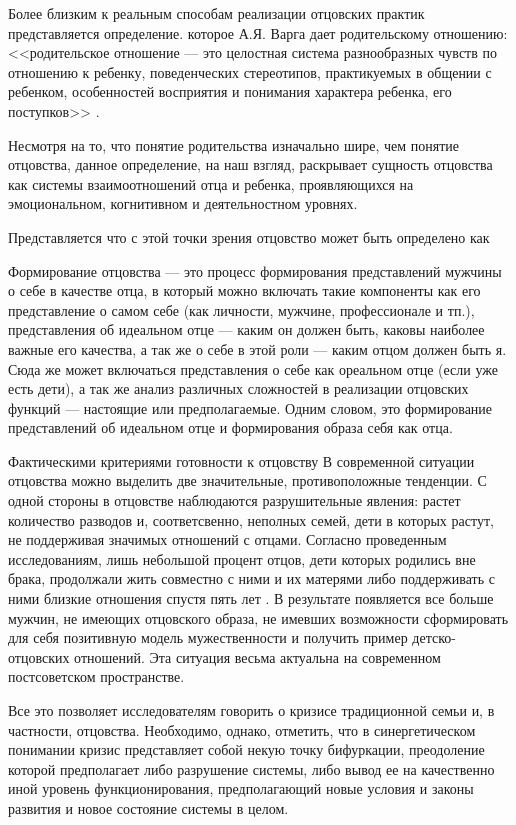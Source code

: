 \documentclass{../../common/thesisbyxetex}
\begin{document}
Более  близким к реальным способам реализации отцовских практик представляется определение. которое
А.Я. Варга дает родительскому отношению: <<родительское отношение --- это целостная система
разнообразных чувств по отношению к ребенку, поведенческих стереотипов, практикуемых в общении с
ребенком, особенностей восприятия и понимания характера ребенка, его поступков>> \cite[7]{varga}.

Несмотря на то, что понятие родительства изначально шире, чем понятие отцовства, данное
определение, на наш взгляд, раскрывает сущность отцовства как системы взаимоотношений отца и
ребенка, проявляющихся на эмоциональном, когнитивном и деятельностном уровнях.

Представляется что с этой точки
зрения отцовство может быть определено как


Формирование отцовства --- это процесс формирования представлений мужчины о себе в качестве отца, в
который можно включать такие компоненты как его представление о самом себе (как личности, мужчине,
профессионале и тп.), представления об идеальном отце --- каким он должен быть, каковы наиболее
важные его качества, а так же о себе в этой роли --- каким отцом должен быть я. Сюда же может
включаться представления о себе как ореальном отце (если уже есть дети), а так же анализ различных
сложностей в реализации отцовских функций --- настоящие или предполагаемые.
Одним словом, это формирование представлений об идеальном отце и формирования образа себя как отца.

Фактическими критериями готовности  к отцовству
В современной ситуации отцовства можно выделить две значительные, противоположные
тенденции. С одной стороны  в отцовстве наблюдаются разрушительные явления: растет количество
разводов и, соответсвенно, неполных семей, дети в которых растут, не поддерживая значимых отношений
с отцами. Согласно проведенным исследованиям, лишь небольшой процент отцов, дети которых
родились вне брака, продолжали жить совместно с ними и их матерями либо поддерживать с ними близкие
отношения спустя пять лет \cite{long}. В результате появляется все больше мужчин, не имеющих
отцовского образа, не имевших возможности сформировать для себя позитивную модель мужественности и
получить пример детско-отцовских отношений. Эта ситуация весьма актуальна на современном
постсоветском пространстве.



Все это позволяет исследователям говорить о кризисе традиционной семьи и, в частности, отцовства.
Необходимо, однако, отметить, что в синергетическом понимании кризис представляет собой некую точку
бифуркации, преодоление которой предполагает либо разрушение системы, либо вывод ее на качественно
иной уровень функционирования, предполагающий новые условия и законы развития и новое состояние
системы в целом.
\end{document}
